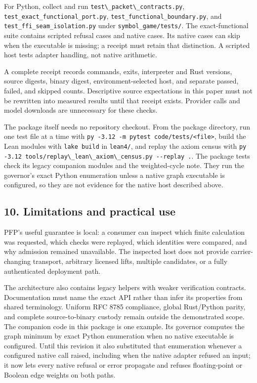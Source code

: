 \documentclass[
  11pt,
]{article}
\newcommand{\passthrough}[1]{#1}
\begin{document}
For Python, collect and run
\passthrough{\lstinline!test\_packet\_contracts.py!},
\nolinkurl{test_exact_functional_port.py},
\nolinkurl{test_functional_boundary.py}, and
\nolinkurl{test_ffi_seam_isolation.py} under
\nolinkurl{symbol_game/tests/}. The exact-functional suite
contains scripted refusal cases and native cases. Its native cases can
skip when the executable is missing; a receipt must retain that
distinction. A scripted host tests adapter handling, not native
arithmetic.

A complete receipt records commands, exits, interpreter and Rust
versions, source digests, binary digest, environment-selected host, and
separate passed, failed, and skipped counts. Descriptive source
expectations in this paper must not be rewritten into measured results
until that receipt exists. Provider calls and model downloads are
unnecessary for these checks.

The package itself needs no repository checkout. From the package
directory, run one test file at a time with
\passthrough{\lstinline!py -3.12 -m pytest code/tests/<file>!}, build
the Lean modules with \passthrough{\lstinline!lake build!} in
\passthrough{\lstinline!lean4/!}, and replay the axiom census with
\passthrough{\lstinline!py -3.12 tools/replay\_lean\_axiom\_census.py --replay .!}.
The package tests check its legacy companion modules and the
weighted-cycle note. They run the governor's exact Python enumeration
unless a native graph executable is configured, so they are not evidence
for the native host described above.

\subsection{10. Limitations and practical
use}\label{limitations-and-practical-use}

PFP's useful guarantee is local: a consumer can inspect which finite
calculation was requested, which checks were replayed, which identities
were compared, and why admission remained unavailable. The inspected
host does not provide carrier-changing transport, arbitrary licensed
lifts, multiple candidates, or a fully authenticated deployment path.

The architecture also contains legacy helpers with weaker verification
contracts. Documentation must name the exact API rather than infer its
properties from shared terminology. Uniform RFC 8785 compliance, global
Rust/Python parity, and complete source-to-binary custody remain outside
the demonstrated scope. The companion code in this package is one
example. Its governor computes the graph minimum by exact Python
enumeration when no native executable is configured. Until this revision
it also substituted that enumeration whenever a configured native call
raised, including when the native adapter refused an input; it now lets
every native refusal or error propagate and refuses floating-point or
Boolean edge weights on both paths.
\end{document}
